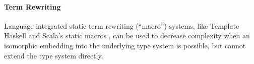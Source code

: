 \documentclass[10pt,preprint]{sigplanconf}
\begin{document}
\paragraph{Term Rewriting}
Language-integrated static term rewriting  (``macro'') systems, like Template Haskell \cite{SheardPeytonJones:Haskell-02} and Scala's static macros \cite{ScalaMacros2013}, can be used to decrease complexity when an isomorphic embedding into the underlying type system is possible, but cannot extend the type system directly.%

\end{document}
